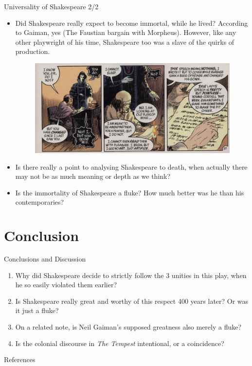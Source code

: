 \documentclass{beamer}
\begin{document}
  \begin{frame}{Universality of Shakespeare 2/2}
    \begin{itemize}
      \item Did Shakespeare really expect to become immortal, while he lived? According to Gaiman, yes (The Faustian bargain with Morpheus). However, like any other playwright of his time, Shakespeare too was a slave of the quirks of production. 
      \begin{figure}[htp]
        \begin{center}
          \centering
          \includegraphics[scale=0.32]{routine.jpg}
        \end{center}
      \end{figure}

    \item Is there really a point to analysing Shakespeare to death, when actually there may not be as much meaning or depth as we think?
      
    \item Is the immortality of Shakespeare a fluke? How much better was he than his contemporaries?
    \end{itemize}
  \end{frame}
  \section{Conclusion}
  
  \begin{frame}{Conclusions and Discussion}
    \begin{enumerate}
    \item Why did Shakespeare decide to strictly follow the 3 unities in this play, when he so easily violated them earlier?
    \item Is Shakespeare really great and worthy of this respect 400 years later? Or was it just a fluke?
    \item On a related note, is Neil Gaiman's supposed greatness also merely a fluke?
    \item Is the colonial discourse in \emph{The Tempest} intentional, or a coincidence?
    \end{enumerate}
  \end{frame}

  \begin{frame}[allowframebreaks]{References}
  \footnotesize{
  
  
  }
  \end{frame}
\end{document}
